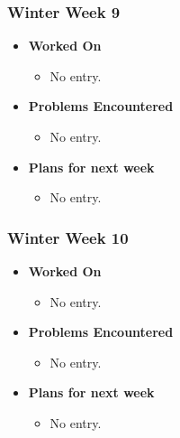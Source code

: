 \documentclass[compsoc,draftclsnofoot,onecolumn,10pt]{IEEEtran}
\begin{document}
\subsubsection{Winter Week 9}
\begin{itemize}
    \item {\textbf{Worked On}}
    \begin{itemize}
      \item No entry.
    \end{itemize}

    \item {\textbf{Problems Encountered}}
    \begin{itemize}
      \item No entry.
    \end{itemize}

    \item{\textbf{Plans for next week}}
    \begin{itemize}
      \item No entry.
    \end{itemize}

\end{itemize}

\subsubsection{Winter Week 10}
\begin{itemize}
    \item {\textbf{Worked On}}
    \begin{itemize}
      \item No entry.
    \end{itemize}

    \item {\textbf{Problems Encountered}}
    \begin{itemize}
      \item No entry.
    \end{itemize}

    \item{\textbf{Plans for next week}}
    \begin{itemize}
      \item No entry.
    \end{itemize}

\end{itemize}
\end{document}
